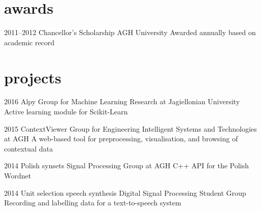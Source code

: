 \documentclass[]{friggeri-cv_osx}
\begin{document}
\section{awards}
\begin{entrylist}
\entry
{2011--2012}
{Chancellor's Scholarship}
{AGH University}
{Awarded annually based on academic record}
\end{entrylist}


\section{projects}
\begin{entrylist}
\entry
{2016}
{Alpy}
{Group for Machine Learning Research at Jagiellonian University}
{Active learning module for Scikit-Learn}

\entry
{2015}
{ContextViewer}
{Group for Engineering Intelligent Systems and Technologies at AGH}
{A web-based tool for preprocessing, visualisation, and browsing of contextual data}

\entry
{2014}
{Polish synsets}
{Signal Processing Group at AGH}
{C++ API for the Polish Wordnet}

\entry
{2014}
{Unit selection speech synthesis}
{Digital Signal Processing Student Group}
{Recording and labelling data for a text-to-speech system}
\end{entrylist}
\end{document}
